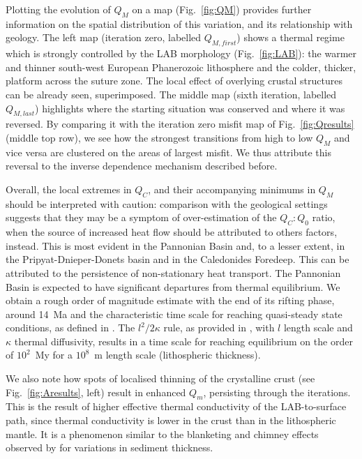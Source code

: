 {Plotting the evolution of $Q_M$ on a map (Fig.~\ref{fig:QM}) provides further information on the spatial distribution of this variation, and its relationship with geology.
The left map (iteration zero, labelled $Q_{M,first}$) shows a thermal regime which is strongly controlled by the LAB morphology (Fig.~\ref{fig:LAB}): the warmer and thinner south-west European Phanerozoic lithosphere and the colder, thicker, platform across the suture zone.
The local effect of overlying crustal structures can be already seen, superimposed.
The middle map (sixth iteration, labelled $Q_{M,last}$) highlights where the starting situation was conserved and where it was reversed.
By comparing it with the iteration zero misfit map of Fig.~\ref{fig:Qresults} (middle top row), we see how the strongest transitions from high to low $Q_M$ and vice versa are clustered on the areas of largest misfit.
We thus attribute this reversal to the inverse dependence mechanism described before.

Overall, the local extremes in $Q_C$, and their accompanying minimums in $Q_M$ should be interpreted with caution: comparison with the geological settings suggests that they may be a symptom of over-estimation of the $Q_C:Q_0$ ratio, when the source of increased heat flow should be attributed to others factors, instead.
This is most evident in the Pannonian Basin and, to a lesser extent, in the Pripyat-Dnieper-Donets basin and in the Caledonides Foredeep.
This can be attributed to the persistence of non-stationary heat transport.
The Pannonian Basin is expected to have significant departures from thermal equilibrium.
We obtain a rough order of magnitude estimate with the end of its rifting phase, around 14~Ma \parencite{Horvath2015} and the characteristic time scale for reaching quasi-steady state conditions, as defined in \parencite{stuwe2007geodynamics}.
The $l^2 / 2\kappa$ rule, as provided in \textcite{stuwe2007geodynamics}, with $l$ length scale and $\kappa$ thermal diffusivity, results in a time scale for reaching equilibrium on the order of $10^2$~My for a $10^8$~m length scale (lithospheric thickness).

We also note how spots of localised thinning of the crystalline crust (see Fig.~\ref{fig:Aresults}, left) result in enhanced $Q_m$, persisting through the iterations.
This is the result of higher effective thermal conductivity of the LAB-to-surface path, since thermal conductivity is lower in the crust than in the lithospheric mantle.
It is a phenomenon similar to the blanketing and chimney effects observed by \textcite{Przybycin2015} for variations in sediment thickness.

}
